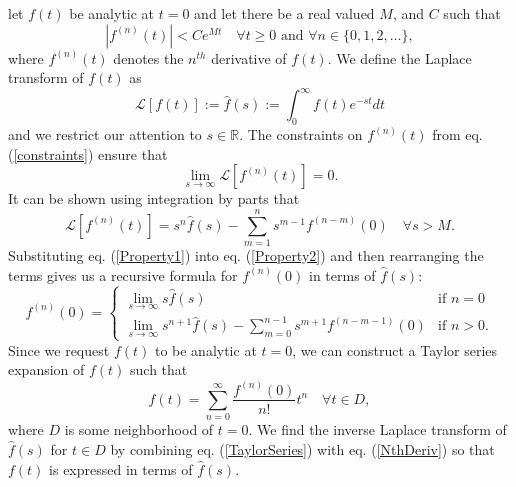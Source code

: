 \documentclass[extra]{gji}
\begin{document}
let $f(t)$ be analytic at $t=0$ and let there
  be a real valued $M$, and $C$ such that
\begin{equation}\label{constraints}
  \left|f^{(n)}(t)\right| < Ce^{Mt}\quad \forall t\geq 0\text{ and }\forall n\in\{0,1,2,\dots\},
\end{equation}
where $f^{(n)}(t)$ denotes the $n^{th}$ derivative of $f(t)$.  We
define the Laplace transform of $f(t)$ as
\begin{equation}
  \mathcal{L}[f(t)] := \hat{f}(s) := \int_{0}^\infty f(t)e^{-st}dt
\end{equation}
and we restrict our attention to $s\in\mathbb{R}$.  The constraints on
$f^{(n)}(t)$ from eq. (\ref{constraints}) ensure that
\begin{equation}\label{Property2}
  \lim_{s \to \infty}\mathcal{L}[f^{(n)}(t)] = 0.
\end{equation}
It can be shown using integration by parts that
\begin{equation}\label{Property1}
  \mathcal{L}[f^{(n)}(t)] = s^n\hat{f}(s) - \sum_{m=1}^ns^{m-1}f^{(n-m)}(0)
  \quad \forall s>M.
\end{equation}
Substituting eq. (\ref{Property1}) into eq. (\ref{Property2}) and then
rearranging the terms gives us a recursive formula for $f^{(n)}(0)$ in
terms of $\hat{f}(s)$:
\begin{equation}\label{NthDeriv}
  f^{(n)}(0) = 
  \begin{cases}
    \lim_{s \to \infty} s\hat{f}(s)& \text{if } n=0\\
    \lim_{s \to \infty} s^{n + 1}\hat{f}(s) - 
                     \sum_{m=0}^{n-1} s^{m+1}f^{(n-m-1)}(0)& \text{if } n > 0.
  \end{cases}
\end{equation}
Since we request $f(t)$ to be analytic at $t=0$, we can construct a
Taylor series expansion of $f(t)$ such that
\begin{equation}\label{TaylorSeries}
  f(t) = \sum_{n=0}^\infty\frac{f^{(n)}(0)}{n!}t^n \quad \forall {t\in D},
\end{equation}
where $D$ is some neighborhood of $t=0$. We find the inverse Laplace
transform of $\hat{f}(s)$ for $t\in D$ by combining
eq. (\ref{TaylorSeries}) with eq. (\ref{NthDeriv}) so that $f(t)$ is
expressed in terms of $\hat{f}(s)$.
\end{document}
